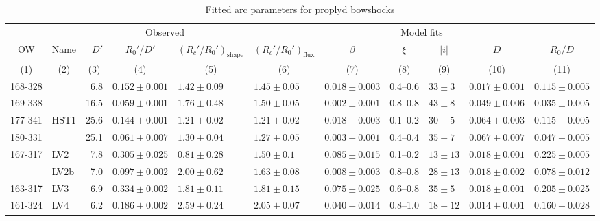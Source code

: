 \begin{table}
  \caption{Fitted arc parameters for proplyd bowshocks}
  \label{tab:arc-fits} 
\newcommand\C[1]{\multicolumn{1}{c}{#1}}
\begin{tabular}{llrllllrlll}\toprule
             &          & \multicolumn{3}{c}{\dotfill Observed \dotfill}              & \multicolumn{6}{c}{\dotfill Model fits \dotfill} \\ 
  \C{OW}     & \C{Name} & \(D'\) &\C{ \(R_0'/D'\) }&\C{ \((R_c'/R_0')_{\mathrm{shape}}\) }&\C{ \((R_c'/R_0')_{\mathrm{flux}}\) }&\C{ \(\beta\) }&\C{ \(\xi\) }&\C{ \(|i|\) }&\C{ \(D\) }&\C{ \(R_0/D\)}\\
  \C{(1)}& \C{ (2) }&\C{ (3)    }&\C{    (4)      }&\C{              (5)           }&\C{           (6)             }&\C{     (7)   }&\C{   (8)   }&\C{   (9) }&\C{  (10) }&\C{   (11)} \\
\midrule     
168-328  &     & 6.8 & \(0.152 \pm 0.001\) & \(1.42 \pm 0.09\) & \(1.45 \pm 0.05\) & \(0.018 \pm 0.003\) & 0.4--0.6 & \(33 \pm 3\) & \(0.017 \pm 0.001\) & \(0.115 \pm 0.005\)\\
169-338  &     & 16.5 & \(0.059 \pm 0.001\) & \(1.76 \pm 0.48\) & \(1.50 \pm 0.05\) & \(0.002 \pm 0.001\) & 0.8--0.8 & \(43 \pm 8\) & \(0.049 \pm 0.006\) & \(0.035 \pm 0.005\)\\
177-341  & HST1& 25.6 & \(0.144 \pm 0.001\) & \(1.21 \pm 0.02\) & \(1.21 \pm 0.02\) & \(0.018 \pm 0.003\) & 0.1--0.2 & \(30 \pm 5\) & \(0.064 \pm 0.003\) & \(0.115 \pm 0.005\)\\
180-331  &     & 25.1 & \(0.061 \pm 0.007\) & \(1.30 \pm 0.04\) & \(1.27 \pm 0.05\) & \(0.003 \pm 0.001\) & 0.4--0.4 & \(35 \pm 7\) & \(0.067 \pm 0.007\) & \(0.047 \pm 0.005\)\\
167-317  & LV2 & 7.8 & \(0.305 \pm 0.025\) & \(0.81 \pm 0.28\) & \(1.50 \pm 0.1\) & \(0.085 \pm 0.015\) & 0.1--0.2 & \(13 \pm 13\) & \(0.018 \pm 0.001\) & \(0.225 \pm 0.005\)\\
         & LV2b& 7.0 & \(0.097 \pm 0.002\) & \(2.00 \pm 0.62\) & \(1.63 \pm 0.08\) & \(0.008 \pm 0.003\) & 0.8--0.8 & \(28 \pm 13\) & \(0.018 \pm 0.002\) & \(0.078 \pm 0.012\)\\
163-317  & LV3 & 6.9 & \(0.334 \pm 0.002\) & \(1.81 \pm 0.11\) & \(1.81 \pm 0.15\) & \(0.075 \pm 0.025\) & 0.6--0.8 & \(35 \pm 5\) & \(0.018 \pm 0.001\) & \(0.205 \pm 0.025\)\\
161-324  & LV4 & 6.2 & \(0.186 \pm 0.002\) & \(2.59 \pm 0.24\) & \(2.05 \pm 0.07\) & \(0.040 \pm 0.014\) & 0.8--1.0 & \(18 \pm 12\) & \(0.014 \pm 0.001\) & \(0.160 \pm 0.028\)\\

\end{tabular}
\end{table}
